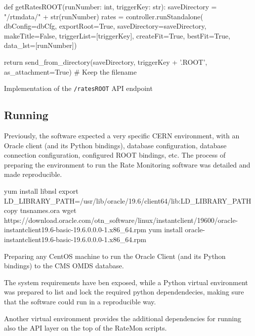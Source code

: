 \begin{listing}[ht]
\begin{pythoncode}
def getRatesROOT(runNumber: int, triggerKey: str):
    saveDirectory = "/rtmdata/" + str(runNumber)
    rates = controller.runStandalone(
                         dbConfig=dbCfg,
                         exportRoot=True,
                         saveDirectory=saveDirectory,
                         makeTitle=False,
                         triggerList=[triggerKey],
                         createFit=True,
                         bestFit=True,
                         data_lst=[runNumber])

    return send_from_directory(saveDirectory,
                               triggerKey + '.ROOT',
                               as_attachment=True) # Keep the filename
\end{pythoncode}
\caption{Implementation of the \texttt{/ratesROOT} API endpoint}
\end{listing}

\subsection{Running}

Previously, the software expected a very specific CERN environment, with an Oracle client (and its Python bindings), database configuration, database connection configuration, configured ROOT bindings, etc. The process of preparing the environment to run the Rate Monitoring software was detailed and made reproducible.

\begin{listing}[ht]
\begin{textcode}
yum install libnsl
export LD_LIBRARY_PATH=/usr/lib/oracle/19.6/client64/lib:LD_LIBRARY_PATH
copy tnsnames.ora
wget https://download.oracle.com/otn_software/linux/instantclient/19600/oracle-instantclient19.6-basic-19.6.0.0.0-1.x86_64.rpm
yum install oracle-instantclient19.6-basic-19.6.0.0.0-1.x86_64.rpm
\end{textcode}
\caption{Preparing any CentOS machine to run the Oracle Client (and its Python bindings) to the CMS OMDS database.}
\end{listing}

The system requirements have ben exposed, while a Python virtual environment was prepared to list and lock the required python dependendecies, making sure that the software could run in a reproducible way.

Another virtual environment provides the additional dependencies for running also the API layer on the top of the RateMon scripts.

